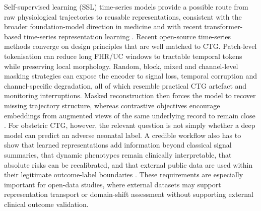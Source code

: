 \documentclass[utf8]{FrontiersinHarvard}
\begin{document}
Self-supervised learning (SSL) time-series models provide a possible route from raw physiological trajectories to reusable representations, consistent with the broader foundation-model direction in medicine and with recent transformer-based time-series representation learning \citep{moor2023,zerveas2021,nie2023,yue2022,goswami2024moment}. Recent open-source time-series methods converge on design principles that are well matched to CTG. Patch-level tokenisation can reduce long FHR/UC windows to tractable temporal tokens while preserving local morphology. Random, block, mixed and channel-level masking strategies can expose the encoder to signal loss, temporal corruption and channel-specific degradation, all of which resemble practical CTG artefact and monitoring interruptions. Masked reconstruction then forces the model to recover missing trajectory structure, whereas contrastive objectives encourage embeddings from augmented views of the same underlying record to remain close \citep{nie2023,yue2022,zhang2022tfc}. For obstetric CTG, however, the relevant question is not simply whether a deep model can predict an adverse neonatal label. A credible workflow also has to show that learned representations add information beyond classical signal summaries, that dynamic phenotypes remain clinically interpretable, that absolute risks can be recalibrated, and that external public data are used within their legitimate outcome-label boundaries \citep{tripodai2024,vanCalster2019,vickers2006}. These requirements are especially important for open-data studies, where external datasets may support representation transport or domain-shift assessment without supporting external clinical outcome validation.
\end{document}

